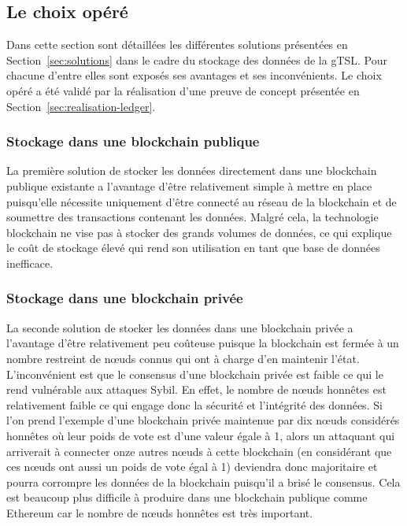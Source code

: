 \documentclass{tnreport}
\begin{document}
\subsection{Le choix opéré}
\label{sec:choice}

Dans cette section sont détaillées les différentes solutions présentées en Section~\ref{sec:solutions} dans le cadre du stockage des données de la gTSL. Pour chacune d'entre elles sont exposés ses avantages et ses inconvénients.
Le choix opéré a été validé par la réalisation d'une preuve de concept présentée en Section~\ref{sec:realisation-ledger}.

\subsubsection{Stockage dans une blockchain publique}

La première solution de stocker les données directement dans une blockchain publique existante a l'avantage d'être relativement simple à mettre en place puisqu'elle nécessite uniquement d'être connecté au réseau de la blockchain et de soumettre des transactions contenant les données. Malgré cela, la technologie blockchain ne vise pas à stocker des grands volumes de données, ce qui explique le coût de stockage élevé qui rend son utilisation en tant que base de données inefficace.

\subsubsection{Stockage dans une blockchain privée}

La seconde solution de stocker les données dans une blockchain privée a l'avantage d'être relativement peu coûteuse puisque la blockchain est fermée à un nombre restreint de nœuds connus qui ont à charge d'en maintenir l'état. L'inconvénient est que le consensus d'une blockchain privée est faible ce qui le rend vulnérable aux attaques Sybil. En effet, le nombre de nœuds honnêtes est relativement faible ce qui engage donc la sécurité et l'intégrité des données. Si l'on prend l'exemple d'une blockchain privée maintenue par dix nœuds considérés honnêtes où leur poids de vote est d'une valeur égale à 1, alors un attaquant qui arriverait à connecter onze autres nœuds à cette blockchain (en considérant que ces nœuds ont aussi un poids de vote égal à 1) deviendra donc majoritaire et pourra corrompre les données de la blockchain puisqu'il a brisé le consensus. Cela est beaucoup plus difficile à produire dans une blockchain publique comme Ethereum car le nombre de nœuds honnêtes est très important.
\end{document}
